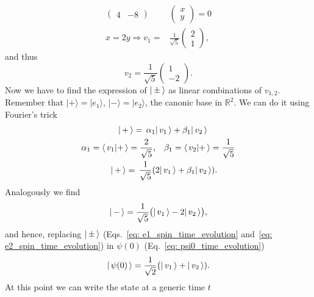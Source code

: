 \begin{enumerate}[(a)]
\begin{equation}
\begin{split}
\begin{pmatrix}
                4 & -8
            \end{pmatrix} &
            \begin{pmatrix}
                x \\
                y
            \end{pmatrix}
            = 0 \\
            x = 2y \Rightarrow 
            v_1 = & \frac{1}{\sqrt{5}}
            \begin{pmatrix}
                2 \\
                1
            \end{pmatrix},
        \end{split}
    \end{equation} 
    and thus 
    \begin{equation}
        v_2 = \frac{1}{\sqrt{5}}
        \begin{pmatrix}
            1 \\
            -2
        \end{pmatrix}.
    \end{equation}
    Now we have to find the expression of $| \,  \pm  \, \rangle$ as linear combinations of $v_{1,2}$. Remember that $ | + \rangle = | e_1 \rangle$, $ | - \rangle = | e_2 \rangle$, the canonic base in $ \mathbb{R}^2 $. We can do it using Fourier's trick
    \begin{align}
        | \, + \, \rangle = \,  \alpha_1 & | \, v_1 \, \rangle + \beta_1 | \, v_2 \, \rangle \notag \\
        \alpha_1 = \langle \, v_1 | + \, \rangle = \frac{2}{\sqrt{5}}, & \quad \beta_1 = \langle \, v_2 | + \, \rangle = \frac{1}{\sqrt{5}} \notag \\
        | \, + \, \rangle = \,  \frac{1}{\sqrt{5}} ( & 2 | \, v_1 \, \rangle + \beta_1 | \, v_2 \, \rangle ) \label{eq: e1_spin_time_evolution}.
    \end{align}
    Analogously we find 
    \begin{equation}
        \label{eq: e2_spin_time_evolution}
        | \, - \, \rangle = \frac{1}{\sqrt{5}} \bigl( | \, v_1 \, \rangle - 2 | \, v_2 \, \rangle \bigr),
    \end{equation}
    and hence, replacing $| \, \pm \, \rangle$ (Eqs.~\eqref{eq: e1_spin_time_evolution} and~\eqref{eq: e2_spin_time_evolution}) in $\psi (0)$ (Eq.~\eqref{eq: psi0_time_evolution})
    \begin{equation}
        | \, \psi (0) \, \rangle = \frac{1}{\sqrt{2}} \bigl( | \, v_1 \, \rangle + | \, v_2 \, \rangle).
    \end{equation}
    At this point we can write the state at a generic time $t$
    \begin{equation}

\end{equation}
\end{enumerate}
